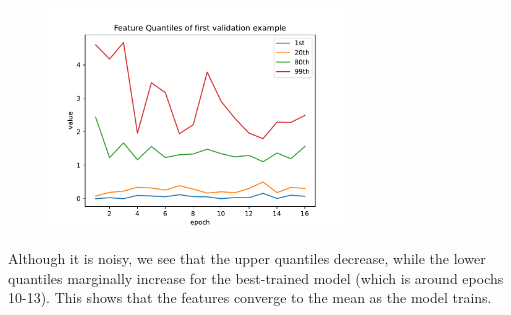 \documentclass[12pt]{article}
\begin{document}
\begin{center}
\begin{figure}[!htbp]
    \centering
    \includegraphics[width=0.7\textwidth]{q2_part7.pdf}
\end{figure}
\end{center}

Although it is noisy, we see that the upper quantiles decrease, while the 
lower quantiles marginally increase for the best-trained model (which is around
epochs 10-13). This shows that the features converge to the mean as the model
trains.
\end{document}
